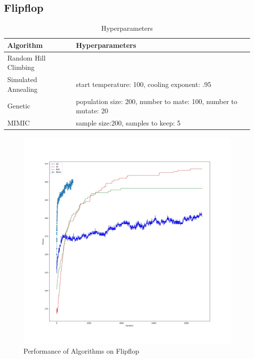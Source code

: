 \documentclass[11pt]{article}
\begin{document}
\subsection{Flipflop}
\begin{table}[h!]
  \begin{center}
    \caption{Hyperparameters}
    \label{tab:hy_ff}
    \begin{tabular}{l|l}
      \textbf{Algorithm} & \textbf{Hyperparameters}\\
      \hline
      Random Hill Climbing & \\
      Simulated Annealing &  start temperature: 100, cooling exponent: .95\\
      Genetic & population size: 200, number to mate: 100, number to mutate: 20\\
      MIMIC & sample size:200, samples to keep: 5\\
    \end{tabular}
  \end{center}
\end{table}
\begin{figure}[h!]
  \includegraphics[width=\linewidth]{../plot/ff_plot.jpg}
  \caption{Performance of Algorithms on Flipflop}
  \label{fig:ff}
\end{figure}
\end{document}
